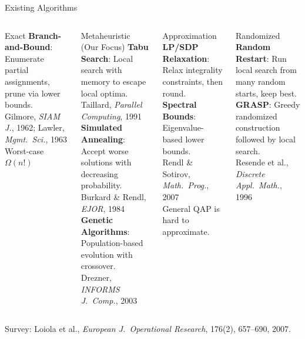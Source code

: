 \documentclass[aspectratio=169,11pt]{beamer}
\begin{document}
\begin{frame}[shrink=5]{Existing Algorithms}
\small
\begin{columns}[T]
\begin{block}{\centering Exact}
\textbf{Branch-and-Bound}: Enumerate partial assignments, prune via lower bounds.\\
{\scriptsize Gilmore, \emph{SIAM J.}, 1962; Lawler, \emph{Mgmt.\ Sci.}, 1963}\\
{\scriptsize Worst-case $\Omega(n!)$}
\end{block}

\begin{block}{\centering Metaheuristic (Our Focus)}
\textbf{Tabu Search}: Local search with memory to escape local optima.\\
{\scriptsize Taillard, \emph{Parallel Computing}, 1991}\\[2pt]
\textbf{Simulated Annealing}: Accept worse solutions with decreasing probability.\\
{\scriptsize Burkard \& Rendl, \emph{EJOR}, 1984}\\[2pt]
\textbf{Genetic Algorithms}: Population-based evolution with crossover.\\
{\scriptsize Drezner, \emph{INFORMS J.\ Comp.}, 2003}
\end{block}

\begin{block}{\centering Approximation}
\textbf{LP/SDP Relaxation}: Relax integrality constraints, then round.\\
\textbf{Spectral Bounds}: Eigenvalue-based lower bounds.\\
{\scriptsize Rendl \& Sotirov, \emph{Math.\ Prog.}, 2007}\\
{\scriptsize General QAP is hard to approximate.}
\end{block}

\begin{block}{\centering Randomized}
\textbf{Random Restart}: Run local search from many random starts, keep best.\\[2pt]
\textbf{GRASP}: Greedy randomized construction followed by local search.\\
{\scriptsize Resende et al., \emph{Discrete Appl.\ Math.}, 1996}
\end{block}
\end{columns}

\vspace{4pt}
\centering
{\scriptsize
Survey: Loiola et al., \emph{European J.\ Operational Research}, 176(2), 657--690, 2007.
}
\end{frame}
\end{document}

